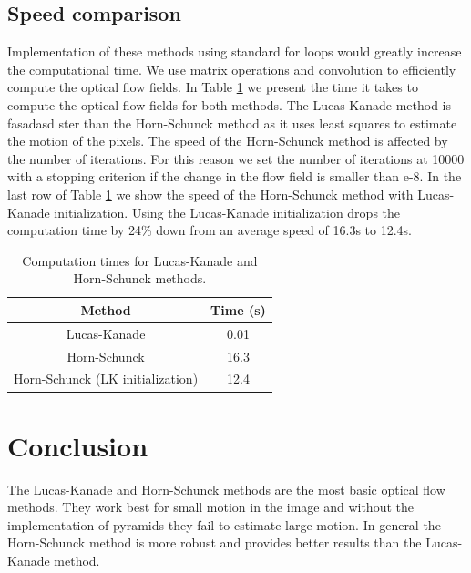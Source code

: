 \documentclass[9pt]{IEEEtran}
\begin{document}
\subsection*{Speed comparison}
Implementation of these methods using standard for loops would greatly increase the computational time.
We use matrix operations and convolution to efficiently compute the optical flow fields.
In Table \ref{speed} we present the time it takes to compute the optical flow fields for both methods.
The Lucas-Kanade method is fasadasd ster than the Horn-Schunck method as it uses least squares to estimate the motion of the pixels.
The speed of the Horn-Schunck method is affected by the number of iterations.
For this reason we set the number of iterations at 10000 with a stopping criterion if the change in the flow field is smaller than e-8.
In the last row of Table \ref{speed} we show the speed of the Horn-Schunck method with Lucas-Kanade initialization.
Using the Lucas-Kanade initialization drops the computation time by 24\% down from an average speed of 16.3s to 12.4s.
\begin{table}[H]
    \centering
    \begin{tabular}{|c|c|}
        \hline
        Method & Time (s) \\
        \hline
        Lucas-Kanade & 0.01 \\
        Horn-Schunck & 16.3 \\
        Horn-Schunck (LK initialization) & 12.4 \\
        \hline
    \end{tabular}
    \caption{Computation times for Lucas-Kanade and Horn-Schunck methods.}
    \label{speed}

\end{table}

\section{Conclusion}
The Lucas-Kanade and Horn-Schunck methods are the most basic optical flow methods.
They work best for small motion in the image and without the implementation of pyramids they fail to estimate large motion.
In general the Horn-Schunck method is more robust and provides better results than the Lucas-Kanade method.



\end{document}
